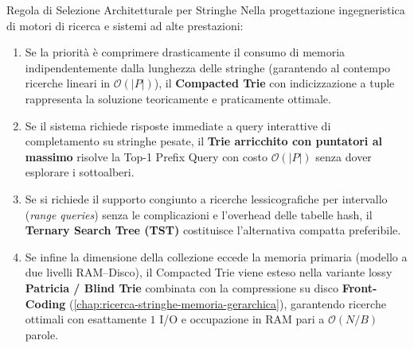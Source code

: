 \begin{noteblock}{Regola di Selezione Architetturale per Stringhe}
Nella progettazione ingegneristica di motori di ricerca e sistemi ad alte prestazioni:
\begin{enumerate}
  \item Se la priorit\`a \`e comprimere drasticamente il consumo di memoria indipendentemente dalla lunghezza delle stringhe (garantendo al contempo ricerche lineari in $\mathcal{O}(|P|)$), il \textbf{Compacted Trie} con indicizzazione a tuple rappresenta la soluzione teoricamente e praticamente ottimale.
  \item Se il sistema richiede risposte immediate a query interattive di completamento su stringhe pesate, il \textbf{Trie arricchito con puntatori al massimo} risolve la Top-1 Prefix Query con costo $\mathcal{O}(|P|)$ senza dover esplorare i sottoalberi.
  \item Se si richiede il supporto congiunto a ricerche lessicografiche per intervallo (\textit{range queries}) senza le complicazioni e l'overhead delle tabelle hash, il \textbf{Ternary Search Tree (TST)} costituisce l'alternativa compatta preferibile.
  \item Se infine la dimensione della collezione eccede la memoria primaria (modello a due livelli RAM--Disco), il Compacted Trie viene esteso nella variante lossy \textbf{Patricia / Blind Trie} combinata con la compressione su disco \textbf{Front-Coding} (\autoref{chap:ricerca-stringhe-memoria-gerarchica}), garantendo ricerche ottimali con esattamente $1$ I/O e occupazione in RAM pari a $\mathcal{O}(N/B)$ parole.
\end{enumerate}
\end{noteblock}

